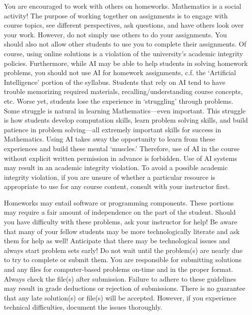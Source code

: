 \documentclass[11pt,letterpaper]{article}
\begin{document}
You are encouraged to work with others on homeworks. Mathematics is a social activity! The purpose of working together on assignments is to engage with course topics, see different perspectives, ask questions, and have others look over your work. However, do not simply use others to do your assignments. You should also not allow other students to use you to complete their assignments. Of course, using online solutions is a violation of the university's academic integrity policies. Furthermore, while AI may be able to help students in solving homework problems, you should not use AI for homework assignments, c.f. the `Artificial Intelligence' portion of the syllabus. Students that rely on AI tend to have trouble memorizing required materials, recalling/understanding course concepts, etc. Worse yet, students lose the experience in `struggling' through problems. Some struggle is natural in learning Mathematics---even important. This struggle is how students develop computation skills, learn problem solving skills, and build patience in problem solving---all extremely important skills for success in Mathematics. Using AI takes away the opportunity to learn from these experiences and build these mental `muscles.' Therefore, use of AI in the course without explicit written permission in advance is forbidden. Use of AI systems may result in an academic integrity violation. To avoid a possible academic integrity violation, if you are unsure of whether a particular resource is appropriate to use for any course content, consult with your instructor first. \pspace

Homeworks may entail software or programming components. These portions may require a fair amount of independence on the part of the student. Should you have difficulty with these problems, ask your instructor for help! Be aware that many of your fellow students may be more technologically literate and ask them for help as well! Anticipate that there may be technological issues and always start problem sets early! Do not wait until the problem(s) are nearly due to try to complete or submit them. You are responsible for submitting solutions and any files for computer-based problems on-time and in the proper format. Always check the file(s) after submission. Failure to adhere to these guidelines may result in grade deductions or rejection of submissions. There is no guarantee that any late solution(s) or file(s) will be accepted. However, if you experience technical difficulties, document the issues thoroughly. 
\sectionbreak
\end{document}
